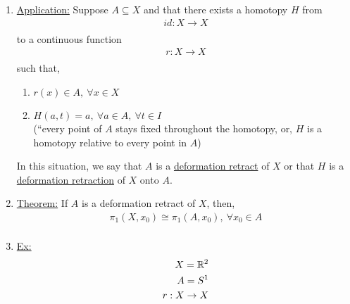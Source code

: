 \begin{enumerate}
\begin{proof}
\begin{align*}
                P(0,t)=H(\alpha(0),t)=H(x_0,t)=y_0\\
                P(1,t)=H(\alpha(1),t)=H(x_0,t)=y_0\\
            \end{align*}
            Because $H$ is a homotopy from $f$ to $g$, the following is true.
            \begin{align*}
                P(s,0)=H(\alpha(s),0)=f(\alpha(s))\\
                P(s,1)=H(\alpha(s),1)=g(\alpha(s))\\
            \end{align*}
        \end{proof}
    \item
        \underline{Application:} Suppose $A\subseteq X$ and that there exists
        a homotopy $H$ from
        \begin{align*}
            id:X\rightarrow X\\
        \end{align*}
        to a continuous function
        \begin{align*}
            r: X\rightarrow X\\
        \end{align*}
        such that,
        \begin{enumerate}
            \item $r(x)\in A,\ \forall x\in X$
            \item $H(a,t)=a,\ \forall a \in A,\ \forall t\in I$\\
                (``every point of $A$ stays fixed throughout the homotopy, or,
                $H$ is a homotopy relative to every point in $A$)
        \end{enumerate}
        In this situation, we say that $A$ is a \underline{deformation retract} of $X$
        or that $H$ is a \underline{deformation retraction} of $X$ onto $A$.
    \item \underline{Theorem:} If $A$ is a deformation retract of $X$, then,
        \begin{align*}
            \pi_1(X,x_0)\cong \pi_1(A,x_0),\ \forall x_0\in A\\
        \end{align*}
    \item\underline{Ex:}
        \begin{align*}
            X=\R^2\\
            A=S^1\\
            r:X\rightarrow X\\

\end{align*}
\end{enumerate}
